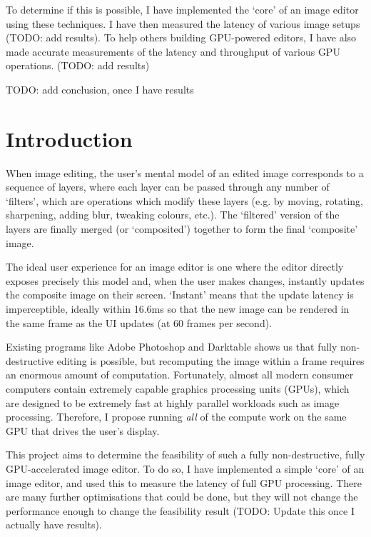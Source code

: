 \documentclass[12pt]{article}
\begin{document}
To determine if this is possible, I have implemented the `core' of an image editor using these
techniques.  I have then measured the latency of various image setups (TODO: add results).  To help
others building GPU-powered editors, I have also made accurate measurements of the latency and
throughput of various GPU operations.  (TODO: add results)

TODO: add conclusion, once I have results



\pagebreak

\tableofcontents



\pagebreak

\section{Introduction}

When image editing, the user's mental model of an edited image corresponds to a sequence of layers,
where each layer can be passed through any number of `filters', which are operations which modify
these layers (e.g. by moving, rotating, sharpening, adding blur, tweaking colours, etc.).  The
`filtered' version of the layers are finally merged (or `composited') together to form the final
`composite' image.

The ideal user experience for an image editor is one where the editor directly exposes precisely
this model and, when the user makes changes, instantly updates the composite image on their screen.
`Instant' means that the update latency is imperceptible, ideally within 16.6ms so that the new
image can be rendered in the same frame as the UI updates (at 60 frames per second).

Existing programs like Adobe Photoshop and Darktable shows us that fully non-destructive editing is
possible, but recomputing the image within a frame requires an enormous amount of computation.
Fortunately, almost all modern consumer computers contain extremely capable graphics processing
units (GPUs), which are designed to be extremely fast at highly parallel workloads such as image
processing.  Therefore, I propose running \emph{all} of the compute work on the same GPU that drives
the user's display.

This project aims to determine the feasibility of such a fully non-destructive, fully
GPU-accelerated image editor.  To do so, I have implemented a simple `core' of an image editor, and
used this to measure the latency of full GPU processing.  There are many further optimisations that
could be done, but they will not change the performance enough to change the feasibility result
(TODO: Update this once I actually have results).
\end{document}
